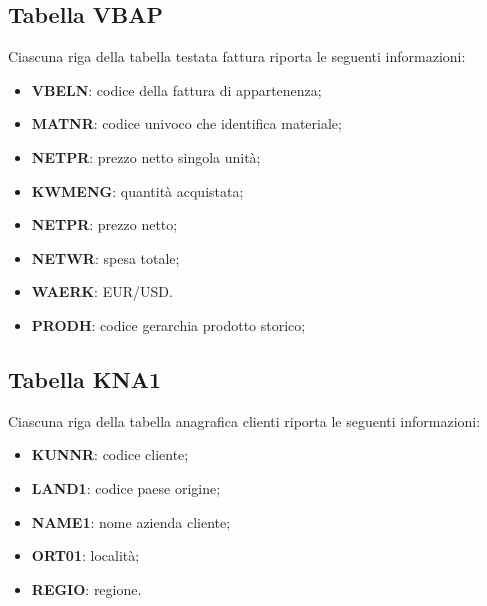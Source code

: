 \subsection{Tabella VBAP}
Ciascuna riga della tabella testata fattura riporta le seguenti informazioni:
\begin{itemize}
	\item \textbf{VBELN}: codice della fattura di appartenenza;
	\item \textbf{MATNR}: codice univoco che identifica materiale;
	\item \textbf{NETPR}: prezzo netto singola unità;
	\item \textbf{KWMENG}: quantità acquistata;
	\item \textbf{NETPR}: prezzo netto;
	\item \textbf{NETWR}: spesa totale;
	\item \textbf{WAERK}: EUR/USD.
	\item \textbf{PRODH}: codice gerarchia prodotto storico; 
\end{itemize}

\subsection{Tabella KNA1}
Ciascuna riga della tabella anagrafica clienti riporta le seguenti informazioni:
\begin{itemize}
	\item \textbf{KUNNR}: codice cliente;
	\item \textbf{LAND1}: codice paese origine;
	\item \textbf{NAME1}: nome azienda cliente;
	\item \textbf{ORT01}: località; 
	\item \textbf{REGIO}: regione.
\end{itemize}

